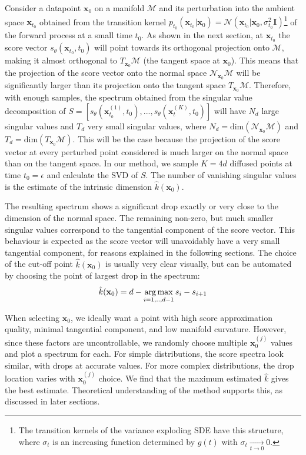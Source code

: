 Consider a datapoint $\textbf{x}_0$ on a manifold $\mathcal{M}$ and its perturbation into the ambient space $\textbf{x}_{t_0}$ obtained from the transition kernel $p_{t_0}(\textbf{x}_{t_0} | \textbf{x}_0) = \mathcal{N}(\textbf{x}_{t_0} | \textbf{x}_0, \sigma^2_{t_0}\textbf{I})$\footnote{The transition kernels of the variance exploding SDE have this structure, where $\sigma_t$ is an increasing function determined by $g(t)$ with $\sigma_t \xrightarrow[t \to 0]{} 0$.} of the forward process at a small time ${t_0}$. As shown in the next section, at $\textbf{x}_{t_0}$ the score vector $s_{\theta}(\textbf{x}_{t_0},{t_0})$ will point towards its orthogonal projection onto $\mathcal{M}$, making it almost orthogonal to $T_{\textbf{x}_0}\mathcal{M}$ (the tangent space at $\textbf{x}_0$). This means that the projection of the score vector onto the normal space $\mathcal{N}_{\textbf{x}_0}\mathcal{M}$ will be significantly larger than its projection onto the tangent space $T_{\textbf{x}_0}\mathcal{M}$. Therefore, with enough samples, the spectrum obtained from the singular value decomposition of $S=[s_{\theta}(\textbf{x}_{t_0}^{(1)},t_0),...,s_{\theta}(\textbf{x}_t^{(K)},t_0)]$ will have $N_d$ large singular values and $T_d$ very small singular values, where $N_d = \text{dim}(\mathcal{N}_{\textbf{x}_0}\mathcal{M})$ and $T_d = \text{dim}(T_{\textbf{x}_0}\mathcal{M})$. This will be the case because the projection of the score vector at every perturbed point considered is much larger on the normal space than on the tangent space. In our method, we sample $K=4d$ diffused points at time $t_0=\epsilon$ and calculate the SVD of $S$. The number of vanishing singular values is the estimate of the intrinsic dimension $\hat{k}(\textbf{x}_0)$.


The resulting spectrum shows a significant drop exactly or very close to the dimension of the normal space. The remaining non-zero, but much smaller singular values correspond to the tangential component of the score vector. This behaviour is expected as the score vector will unavoidably have a very small tangential component, for reasons explained in the following sections. The choice of the cut-off point $\hat{k}(\textbf{x}_0)$ is usually very clear visually, but can be automated by choosing the point of largest drop in the spectrum:
\begin{gather*}
  \hat{k}(\textbf{x}_0) = d - \operatorname*{arg\,max}_{i=1,..,d-1} s_i - s_{i+1} 
\end{gather*}

When selecting $\textbf{x}_0$, we ideally want a point with high score approximation quality, minimal tangential component, and low manifold curvature. However, since these factors are uncontrollable, we randomly choose multiple $\textbf{x}_0^{(j)}$ values and plot a spectrum for each. For simple distributions, the score spectra look similar, with drops at accurate values. For more complex distributions, the drop location varies with $\textbf{x}_0^{(j)}$ choice. We find that the maximum estimated $\hat{k}$ gives the best estimate. Theoretical understanding of the method supports this, as discussed in later sections.

